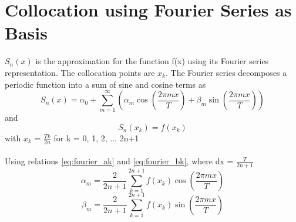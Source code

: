 \documentclass[12pt]{report} %
\begin{document}
\section{Collocation using Fourier Series as Basis}
$S_n(x)$ is the approximation for the function f(x) using its Fourier series representation. The collocation points are $x_k$. The Fourier series decomposes a periodic function into a sum of sine and cosine terms as 
\[
    S_n (x) = \alpha_0 + \sum_{m=1}^{\infty} \left( \alpha_m \cos\left(\frac{2 \pi m x}{T}\right) + \beta_m \sin\left(\frac{2 \pi m x}{T}\right) \right)   
\]
and
\[
S_n (x_k) = f (x_k) 
\]
with $x_k$ = $\frac{T k}{2n}$ for k = 0, 1, 2, $\ldots$ 2n+1\\\\
Using relations \ref{eq:fourier_ak} and \ref{eq:fourier_bk}, where dx = $\frac{T}{2n+1}$ 
\[
 \alpha_m = \frac{2}{2n+1} \sum^{2n+1}_{k=1} f(x_k) \cos\left(\frac{2 \pi m x}{T}\right) 
\]
\[
 \beta_m =  \frac{2}{2n+1} \sum^{2n+1}_{k=1} f(x_k)  \sin\left(\frac{2 \pi m x}{T}\right)
\]
\end{document}
